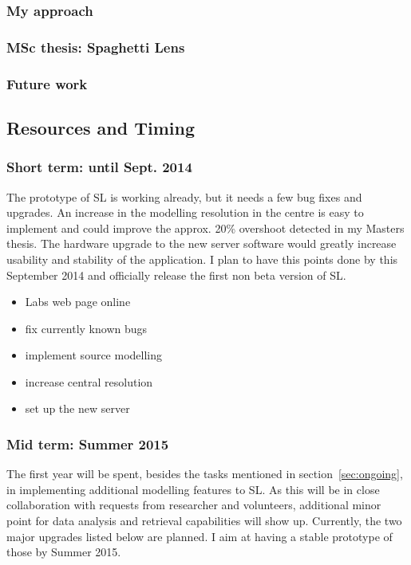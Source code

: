 \documentclass[11pt]{article}
\begin{document}
\subsubsection{My approach}

\subsubsection{MSc thesis: Spaghetti Lens}

\subsubsection{Future work}




\subsection{Resources and Timing}

\subsubsection{Short term: until Sept. 2014}
The prototype of SL is working already, but it needs a few bug fixes and upgrades.
An increase in the modelling resolution in the centre is easy to implement and could improve the approx. 20\% overshoot detected in my Masters thesis.
The hardware upgrade to the new server software would greatly increase usability and stability of the application.
I plan to have this points done by this September 2014 and officially release the first non beta version of SL.

\begin{itemize}
	\item Labs web page online
  \item fix currently known bugs
  \item implement source modelling
  \item increase central resolution
  \item set up the new server
\end{itemize}


\subsubsection{Mid term: Summer 2015}

The first year will be spent, besides the tasks mentioned in section~\ref{sec:ongoing}, in implementing additional modelling features to SL.
As this will be in close collaboration with requests from researcher and volunteers, additional minor point for data analysis and retrieval capabilities will show up.
Currently, the two major upgrades listed below are planned. I aim at having a stable prototype of those by Summer 2015.
\end{document}
